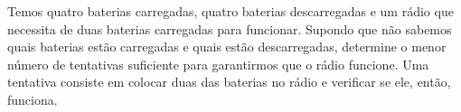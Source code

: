Temos quatro baterias carregadas, quatro baterias descarregadas e um rádio que necessita de duas baterias carregadas para funcionar.
Supondo que não sabemos quais baterias estão carregadas e quais estão descarregadas, determine o menor número de tentativas suficiente para garantirmos que o rádio funcione.
Uma tentativa consiste em colocar duas das baterias no rádio e verificar se ele, então, funciona.
